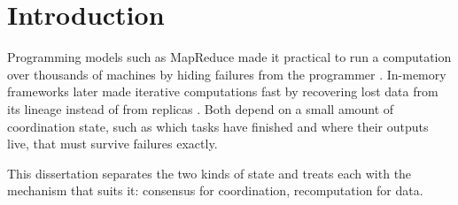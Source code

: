 \chapter{Introduction}
\label{ch:introduction}

Programming models such as MapReduce made it practical to run a computation over thousands of
machines by hiding failures from the programmer \citep{dean2008}. In-memory frameworks later
made iterative computations fast by recovering lost data from its lineage instead of from
replicas \citep{zaharia2012}. Both depend on a small amount of coordination state, such as
which tasks have finished and where their outputs live, that must survive failures exactly.

This dissertation separates the two kinds of state and treats each with the mechanism that
suits it: consensus for coordination, recomputation for data.
